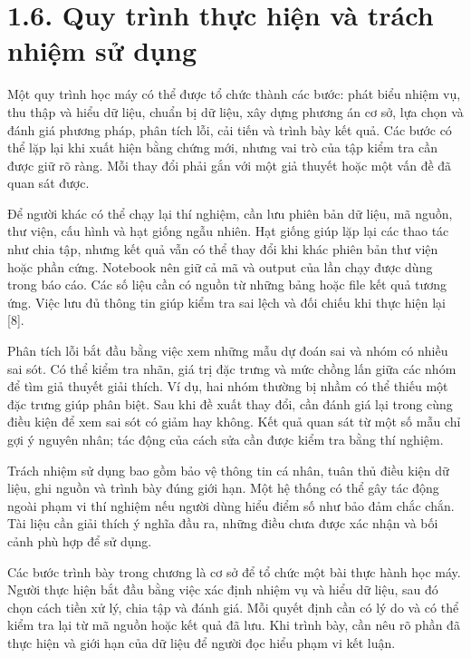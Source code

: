 \section{1.6. Quy trình thực hiện và trách nhiệm sử dụng}

Một quy trình học máy có thể được tổ chức thành các bước: phát biểu nhiệm vụ, thu thập và hiểu dữ liệu, chuẩn bị dữ liệu, xây dựng phương án cơ sở, lựa chọn và đánh giá phương pháp, phân tích lỗi, cải tiến và trình bày kết quả. Các bước có thể lặp lại khi xuất hiện bằng chứng mới, nhưng vai trò của tập kiểm tra cần được giữ rõ ràng. Mỗi thay đổi phải gắn với một giả thuyết hoặc một vấn đề đã quan sát được.


Để người khác có thể chạy lại thí nghiệm, cần lưu phiên bản dữ liệu, mã nguồn, thư viện, cấu hình và hạt giống ngẫu nhiên. Hạt giống giúp lặp lại các thao tác như chia tập, nhưng kết quả vẫn có thể thay đổi khi khác phiên bản thư viện hoặc phần cứng. Notebook nên giữ cả mã và output của lần chạy được dùng trong báo cáo. Các số liệu cần có nguồn từ những bảng hoặc file kết quả tương ứng. Việc lưu đủ thông tin giúp kiểm tra sai lệch và đối chiếu khi thực hiện lại [8].


Phân tích lỗi bắt đầu bằng việc xem những mẫu dự đoán sai và nhóm có nhiều sai sót. Có thể kiểm tra nhãn, giá trị đặc trưng và mức chồng lấn giữa các nhóm để tìm giả thuyết giải thích. Ví dụ, hai nhóm thường bị nhầm có thể thiếu một đặc trưng giúp phân biệt. Sau khi đề xuất thay đổi, cần đánh giá lại trong cùng điều kiện để xem sai sót có giảm hay không. Kết quả quan sát từ một số mẫu chỉ gợi ý nguyên nhân; tác động của cách sửa cần được kiểm tra bằng thí nghiệm.


Trách nhiệm sử dụng bao gồm bảo vệ thông tin cá nhân, tuân thủ điều kiện dữ liệu, ghi nguồn và trình bày đúng giới hạn. Một hệ thống có thể gây tác động ngoài phạm vi thí nghiệm nếu người dùng hiểu điểm số như bảo đảm chắc chắn. Tài liệu cần giải thích ý nghĩa đầu ra, những điều chưa được xác nhận và bối cảnh phù hợp để sử dụng.


Các bước trình bày trong chương là cơ sở để tổ chức một bài thực hành học máy. Người thực hiện bắt đầu bằng việc xác định nhiệm vụ và hiểu dữ liệu, sau đó chọn cách tiền xử lý, chia tập và đánh giá. Mỗi quyết định cần có lý do và có thể kiểm tra lại từ mã nguồn hoặc kết quả đã lưu. Khi trình bày, cần nêu rõ phần đã thực hiện và giới hạn của dữ liệu để người đọc hiểu phạm vi kết luận.



